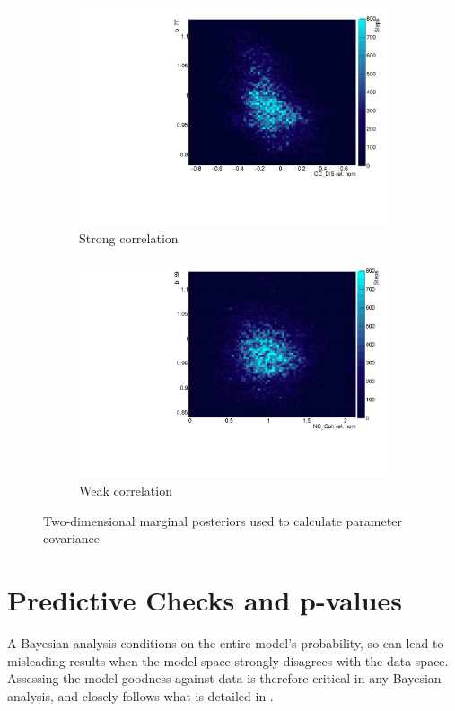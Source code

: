 \begin{figure}[h]
	\begin{subfigure}[t]{0.40\textwidth}
		\includegraphics[width=\textwidth, trim={0mm 0mm 0mm 0mm}, clip,page=1]{figures/mcmc/example_corr}
		\caption{Strong correlation}
	\end{subfigure}
	\begin{subfigure}[t]{0.40\textwidth}
		\includegraphics[width=\textwidth, trim={0mm 0mm 0mm 0mm}, clip,page=1]{figures/mcmc/example_corr2}
		\caption{Weak correlation}
	\end{subfigure}
	\caption{Two-dimensional marginal posteriors used to calculate parameter covariance}
	\label{fig:cov_2d_posterior}
\end{figure}

\section{Predictive Checks and p-values}
A Bayesian analysis conditions on the entire model's probability, so can lead to misleading results when the model space strongly disagrees with the data space. Assessing the model goodness against data is therefore critical in any Bayesian analysis, and closely follows what is detailed in \cite{posterior_predictive_checks, posterior_predictive_checks2, posterior_predictive_checks3, prior_predictive_checks}. 

